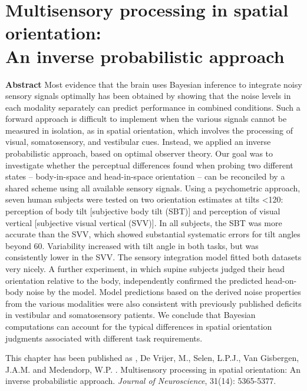
\thispagestyle{empty}

\chapter{Multisensory processing in spatial orientation:\\An inverse probabilistic approach}
\chaptermark{}
\label{p1}

\newpage

\small {\bf Abstract} Most evidence that the brain uses Bayesian inference to integrate noisy sensory signals optimally has been obtained by showing that the noise levels in each modality separately can predict performance in combined conditions. Such a forward approach is difficult to implement when the various signals cannot be measured in isolation, as in spatial orientation, which involves the processing of visual, somatosensory, and vestibular cues. Instead, we applied an inverse probabilistic approach, based on optimal observer theory. Our goal was to investigate whether the perceptual differences found when probing two different states -- body-in-space and head-in-space orientation -- can be reconciled by a shared scheme using all available sensory signals. Using a psychometric approach, seven human subjects were tested on two orientation estimates at tilts \textless 120\textdegree: perception of body tilt [subjective body tilt (SBT)] and perception of visual vertical [subjective visual vertical (SVV)]. In all subjects, the SBT was more accurate than the SVV, which showed substantial systematic errors for tilt angles beyond 60\textdegree. Variability increased with tilt angle in both tasks, but was consistently lower in the SVV. The sensory integration model fitted both datasets very nicely. A further experiment, in which supine subjects judged their head orientation relative to the body, independently confirmed the predicted head-on-body noise by the model. Model predictions based on the derived noise properties from the various modalities were also consistent with previously published deficits in vestibular and somatosensory patients. We conclude that Bayesian computations can account for the typical differences in spatial orientation judgments associated with different task requirements.

\vfill

\noindent\underline{ \hspace{4cm} }

\noindent This chapter has been published as \newline
{}, De Vrijer, M., Selen, L.P.J., Van Gisbergen, J.A.M. and Medendorp, W.P. \citeyear{clemens2011}. Multisensory processing in spatial orientation: An inverse probabilistic approach. \emph{Journal of Neuroscience}, 31(14): 5365-5377. \newline

